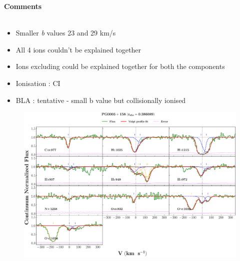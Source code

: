 \documentclass[12pt]{report}
\newcommand\ion[2]{\text{#1\,\textsc{\lowercase{#2}}}}
\begin{document}
\newpage

\textbf{Comments}
\\\\
\begin{itemize}
    \item Smaller \emph{b} values 23 and 29 km/s
    \item All 4 ions couldn't be explained together
    \item Ions excluding \ion{O}{vi} could be explained together for both the components
    \item Ionisation : CI
    \item BLA : tentative - small b value but collisionally ionised
\end{itemize}


\newpage


\begin{landscape}

    \begin{figure}
    \centering
    \vspace{-20mm}
    \hspace*{-35mm}
    \includegraphics[width=1.25\linewidth]{System-Plots/PG0003+158_z=0.386089_sys_plot.png}
    \end{figure}
    
\end{landscape}
\end{document}
